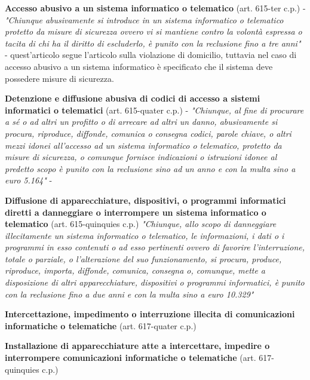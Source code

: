 \vspace{5mm}

\textbf{Accesso abusivo a un sistema informatico o telematico} (art. 615-ter c.p.) - \textit{"Chiunque abusivamente si introduce in un sistema informatico o telematico protetto da misure di sicurezza ovvero vi si mantiene contro la volontà espressa o tacita di chi ha il diritto di escluderlo, è punito con la reclusione fino a tre anni"} - quest'articolo segue l'articolo sulla violazione di domicilio, tuttavia nel caso di accesso abusivo a un sistema informatico è specificato che il sistema deve possedere misure di sicurezza.

\vspace{5mm}

\textbf{Detenzione e diffusione abusiva di codici di accesso a sistemi informatici o telematici} (art. 615-quater c.p.) - \textit{"Chiunque, al fine di procurare a sé o ad altri un profitto o di arrecare ad altri un danno, abusivamente si procura, riproduce, diffonde, comunica o consegna codici, parole chiave, o altri mezzi idonei all'accesso ad un sistema informatico o telematico, protetto da misure di sicurezza, o comunque fornisce indicazioni o istruzioni idonee al predetto scopo è punito con la reclusione sino ad un anno e con la multa sino a euro 5.164"} - 

\vspace{5mm}

\textbf{Diffusione di apparecchiature, dispositivi, o programmi informatici diretti a danneggiare o interrompere un sistema informatico o telematico} (art. 615-quinquies c.p.)  \textit{"Chiunque, allo scopo di danneggiare illecitamente un sistema informatico o telematico, le informazioni, i dati o i programmi in esso contenuti o ad esso pertinenti ovvero di favorire l'interruzione, totale o parziale, o l'alterazione del suo funzionamento, si procura, produce, riproduce, importa, diffonde, comunica, consegna o, comunque, mette a disposizione di altri apparecchiature, dispositivi o programmi informatici, è punito con la reclusione fino a due anni e con la multa sino a euro 10.329"}

\vspace{5mm}

\textbf{Intercettazione, impedimento o interruzione illecita di comunicazioni informatiche o telematiche} (art. 617-quater c.p.)

\vspace{5mm}

\textbf{Installazione di apparecchiature atte a intercettare, impedire o interrompere comunicazioni informatiche o telematiche} (art. 617-quinquies c.p.)

